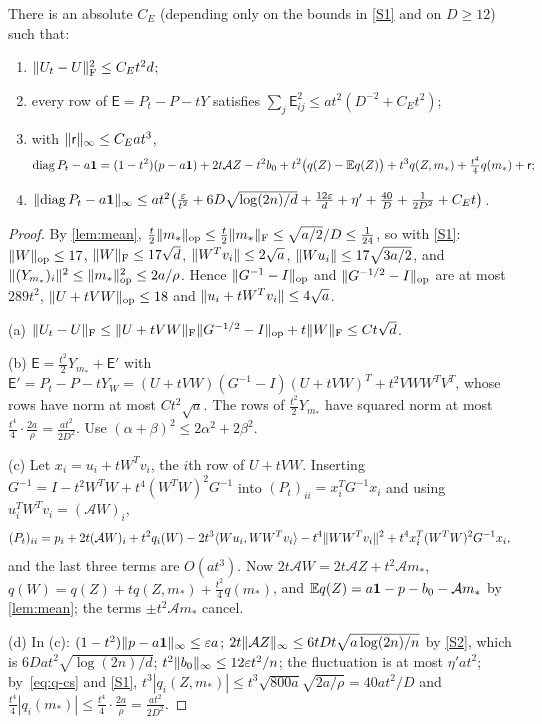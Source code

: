 \begin{lemma}\label{lem:retraction}
There is an absolute $C_E$ (depending only on the bounds in \ref{S1} and on
$D\ge12$) such that:
\begin{enumerate}[label=(\alph*)]
\item $\lVert U_t-U\rVert_{\mathrm F}^2\le C_Et^2d$;
\item every row of $\mathsf E=P_t-P-tY$ satisfies
$\sum_j\mathsf E_{ij}^2\le at^2(D^{-2}+C_Et^2)$;
\item with $\lVert \mathsf r\rVert_\infty\le C_Eat^3$,
\[
 \operatorname{diag} P_t-a\mathbf 1=(1-t^2)(p-a\mathbf 1)+2t\mathcal AZ-t^2b_0+t^2\bigl(q(Z)-\mathbb E q(Z)\bigr)
 +t^3q(Z,m_*)+\tfrac{t^4}4q(m_*)+\mathsf r ;
\]
\item $\lVert \operatorname{diag} P_t-a\mathbf 1\rVert_\infty\le at^2\bigl(\frac{\varepsilon}{t^2}
+6D\sqrt{\log(2n)/d}+\frac{12\varepsilon}d+\eta'+\frac{40}D+\frac1{2D^2}+C_Et\bigr)$.
\end{enumerate}
\end{lemma}

\begin{proof}
By \cref{lem:mean}, $\frac t2\lVert m_*\rVert_{\mathrm{op}}\le\frac t2\lVert m_*\rVert_{\mathrm F}\le\sqrt{a/2}/D\le\frac1{24}$,
so with \ref{S1}: $\lVert W\rVert_{\mathrm{op}}\le17$, $\lVert W\rVert_{\mathrm F}\le17\sqrt d$,
$\lVert W^Tv_i\rVert\le2\sqrt a$, $\lVert Wu_i\rVert\le17\sqrt{3a/2}$, and
$\lVert (Y_{m_*})_i\rVert^2\le\lVert m_*\rVert_{\mathrm{op}}^2\le2a/\rho$. Hence $\lVert G^{-1}-I\rVert_{\mathrm{op}}$ and
$\lVert G^{-1/2}-I\rVert_{\mathrm{op}}$ are at most $289t^2$, $\lVert U+tVW\rVert_{\mathrm{op}}\le18$ and
$\lVert u_i+tW^Tv_i\rVert\le4\sqrt a$.

(a) $\lVert U_t-U\rVert_{\mathrm F}\le\lVert U+tVW\rVert_{\mathrm F}\lVert G^{-1/2}-I\rVert_{\mathrm{op}}+t\lVert W\rVert_{\mathrm F}\le Ct\sqrt d$.

(b) $\mathsf E=\frac{t^2}2Y_{m_*}+\mathsf E'$ with
$\mathsf E'=P_t-P-tY_W=(U+tVW)(G^{-1}-I)(U+tVW)^T+t^2VWW^TV^T$, whose rows have
norm at most $Ct^2\sqrt a$. The rows of $\frac{t^2}2Y_{m_*}$ have squared norm at
most $\frac{t^4}4\cdot\frac{2a}\rho=\frac{at^2}{2D^2}$. Use $(\alpha+\beta)^2\le
2\alpha^2+2\beta^2$.

(c) Let $x_i=u_i+tW^Tv_i$, the $i$th row of $U+tVW$. Inserting
$G^{-1}=I-t^2W^TW+t^4(W^TW)^2G^{-1}$ into $(P_t)_{ii}=x_i^TG^{-1}x_i$ and using
$u_i^TW^Tv_i=(\mathcal AW)_i$,
\[
 (P_t)_{ii}=p_i+2t(\mathcal AW)_i+t^2q_i(W)-2t^3\langle Wu_i,WW^Tv_i\rangle
 -t^4\lVert WW^Tv_i\rVert^2+t^4x_i^T(W^TW)^2G^{-1}x_i ,
\]
and the last three terms are $O(at^3)$. Now $2t\mathcal AW=2t\mathcal AZ+t^2\mathcal
Am_*$, $q(W)=q(Z)+tq(Z,m_*)+\frac{t^2}4q(m_*)$, and
$\mathbb E q(Z)=a\mathbf 1-p-b_0-\mathcal Am_*$ by \cref{lem:mean}; the terms $\pm t^2\mathcal
Am_*$ cancel.

(d) In (c): $(1-t^2)\lVert p-a\mathbf 1\rVert_\infty\le\varepsilon a$;
$2t\lVert \mathcal AZ\rVert_\infty\le6tD t\sqrt{a\log(2n)/n}$ by \ref{S2}, which is
$6Dat^2\sqrt{\log(2n)/d}$; $t^2\lVert b_0\rVert_\infty\le12\varepsilon t^2/n$; the fluctuation is
at most $\eta'at^2$; by~\eqref{eq:q-cs} and \ref{S1},
$t^3|q_i(Z,m_*)|\le t^3\sqrt{800a}\sqrt{2a/\rho}=40at^2/D$ and
$\frac{t^4}4|q_i(m_*)|\le\frac{t^4}4\cdot\frac{2a}\rho=\frac{at^2}{2D^2}$.
\end{proof}


